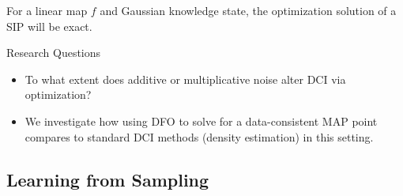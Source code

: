 \documentclass[11pt]{beamer}
\begin{document}
\begin{frame}



For a linear map $f$ and Gaussian knowledge state, the optimization solution of a SIP will be exact.

\begin{block}{Research Questions}

\begin{itemize}

		\item To what extent does additive or multiplicative noise %
		alter DCI via optimization? %
		
		\item We investigate how using DFO to solve for a data-consistent MAP point compares to standard DCI methods (density estimation) in this setting.

\end{itemize}


\end{block}


\end{frame}

\subsection{Learning from Sampling}
\end{document}
